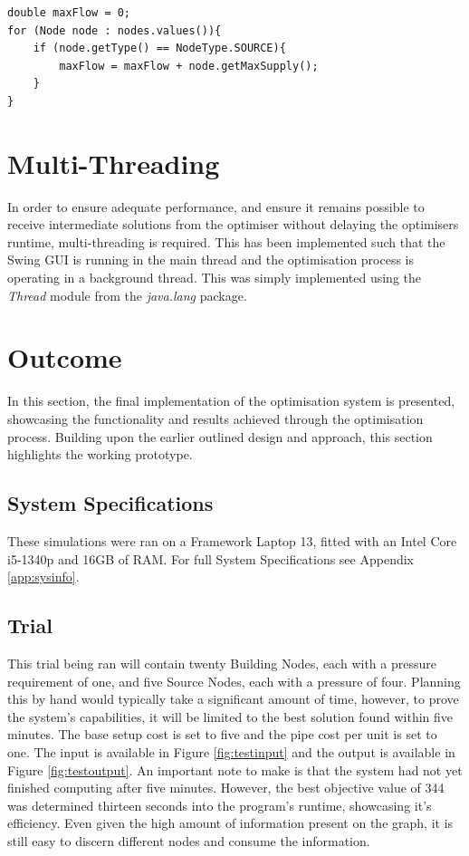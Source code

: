 \begin{lstlisting}
double maxFlow = 0;
for (Node node : nodes.values()){
    if (node.getType() == NodeType.SOURCE){
        maxFlow = maxFlow + node.getMaxSupply();
    }
}
\end{lstlisting}

\section{Multi-Threading}
In order to ensure adequate performance, and ensure it remains possible to receive intermediate solutions from the optimiser without delaying the optimisers runtime, multi-threading is required. This has been implemented such that the Swing GUI is running in the main thread and the optimisation process is operating in a background thread. This was simply implemented using the \textit{Thread} module from the \textit{java.lang} package.

\section{Outcome}
In this section, the final implementation of the optimisation system is presented, showcasing the functionality and results achieved through the optimisation process. Building upon the earlier outlined design and approach, this section highlights the working prototype.

\subsection{System Specifications}\label{sysinfo}
These simulations were ran on a Framework Laptop 13, fitted with an Intel Core i5-1340p and 16GB of RAM. For full System Specifications see Appendix \ref{app:sysinfo}.

\subsection{Trial}
This trial being ran will contain twenty Building Nodes, each with a pressure requirement of one, and five Source Nodes, each with a pressure of four. Planning this by hand would typically take a significant amount of time, however, to prove the system's capabilities, it will be limited to the best solution found within five minutes. The base setup cost is set to five and the pipe cost per unit is set to one.\newline\newline
The input is available in Figure \ref{fig:testinput} and the output is available in Figure \ref{fig:testoutput}. 
An important note to make is that the system had not yet finished computing after five minutes. However, the best objective value of 344 was determined thirteen seconds into the program's runtime, showcasing it's efficiency. Even given the high amount of information present on the graph, it is still easy to discern different nodes and consume the information.

